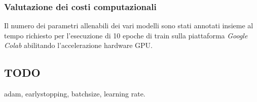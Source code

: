 
\subsubsection{Valutazione dei costi computazionali}

Il numero dei parametri allenabili dei vari modelli sono stati annotati insieme
al tempo richiesto per l'esecuzione di 10 epoche di train sulla piattaforma
\textit{Google Colab} abilitando l'accelerazione hardware GPU.


\subsection{TODO}

adam, earlystopping, batchsize, learning rate.
